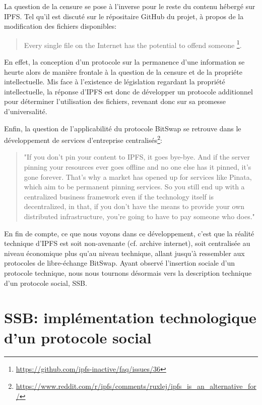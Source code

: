 \documentclass{article}
\begin{document}
La question de la censure se pose à l'inverse pour le reste du contenu hébergé sur IPFS. Tel qu'il est discuté sur le répositaire GitHub du projet, à propos de la modification des fichiers disponibles:

\begin{quote}
    Every single file on the Internet has the potential to offend someone \footnote{\url{https://github.com/ipfs-inactive/faq/issues/36}}.
\end{quote}

En effet, la conception d'un protocole sur la permanence d'une information se heurte alors de manière frontale à la question de la censure et de la propriéte intellectuelle. Mis face à l'existence de législation regardant la propriété intellectuelle, la réponse d'IPFS est donc de développer un protocole additionnel pour déterminer l'utilisation des fichiers, revenant donc sur sa promesse d'universalité.

Enfin, la question de l'applicabilité du protocole BitSwap se retrouve dans le développement de services d'entreprise centralisés\footnote{\url{https://www.reddit.com/r/ipfs/comments/ruxlej/ipfs_is_an_alternative_for/}}:

\begin{quote}
    "If you don't pin your content to IPFS, it goes bye-bye. And if the server pinning your resources ever goes offline and no one else has it pinned, it's gone forever. That's why a market has opened up for services like Pinata, which aim to be permanent pinning services. So you still end up with a centralized business framework even if the technology itself is decentralized, in that, if you don't have the means to provide your own distributed infrastructure, you're going to have to pay someone who does." 
\end{quote}

En fin de compte, ce que nous voyons dans ce développement, c'est que la réalité technique d'IPFS est soit non-avenante (cf. archive internet), soit centralisée au niveau économique plus qu'au niveau technique, allant jusqu'à ressembler aux protocoles de libre-échange BitSwap. Ayant observé l'insertion sociale d'un protocole technique, nous nous tournons désormais vers la description technique d'un protocole social, SSB.

\section{SSB: implémentation technologique d'un protocole social}
\end{document}

